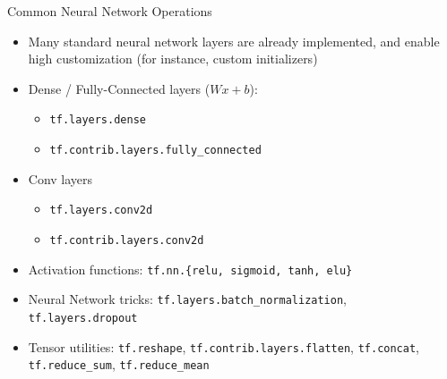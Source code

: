 \documentclass[]{beamer}
\begin{document}
\begin{frame}[fragile]{Common Neural Network Operations}

\begin{itemize}
\item Many standard neural network layers are already implemented, and enable high customization (for instance, custom initializers)
\item Dense / Fully-Connected layers ($Wx + b$):
\begin{itemize}
\item \verb|tf.layers.dense|
\item \verb|tf.contrib.layers.fully_connected|
\end{itemize}
\item Conv layers
\begin{itemize}
\item \verb|tf.layers.conv2d|
\item \verb|tf.contrib.layers.conv2d|
\end{itemize}
\item Activation functions: \verb|tf.nn.{relu, sigmoid, tanh, elu}|
\item Neural Network tricks: \verb|tf.layers.batch_normalization|, \verb|tf.layers.dropout|
\item Tensor utilities: \verb|tf.reshape|, \verb|tf.contrib.layers.flatten|, \verb|tf.concat|, \verb|tf.reduce_sum|, \verb|tf.reduce_mean|
\end{itemize}

\end{frame}
\end{document}
